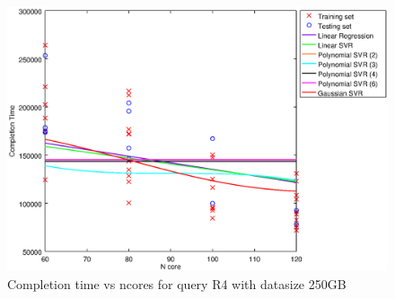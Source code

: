 
\begin {figure}[hbtp]
\centering
\includegraphics[width=\textwidth]{output/R4_250_LINEAR_NCORE/plot_R4_250.eps}
\caption{Completion time vs ncores for query R4 with datasize 250GB}
\label{fig:coreonly_linear_R4_250}
\end {figure}
